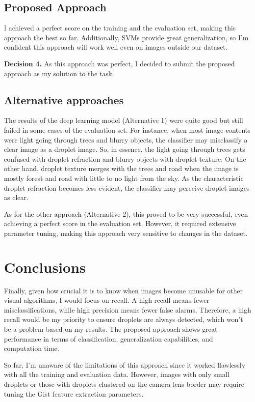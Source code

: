 \documentclass[conference]{IEEEtran}
\begin{document}
\subsection{Proposed Approach}

I achieved a perfect score on the training and the evaluation set, making this approach the best so far. Additionally, SVMs provide great generalization, so I'm confident this approach will work well even on images outside our dataset.

\textbf{Decision 4.} As this approach was perfect, I decided to submit the proposed approach as my solution to the task.

\subsection{Alternative approaches}

The results of the deep learning model (Alternative 1) were quite good but still failed in some cases of the evaluation set. For instance, when most image contents were light going through trees and blurry objects, the classifier may misclassify a clear image as a droplet image. So, in essence, the light going through trees gets confused with droplet refraction and blurry objects with droplet texture. On the other hand, droplet texture merges with the trees and road when the image is mostly forest and road with little to no light from the sky. As the characteristic droplet refraction becomes less evident, the classifier may perceive droplet images as clear.

As for the other approach (Alternative 2), this proved to be very successful, even achieving a perfect score in the evaluation set. However, it required extensive parameter tuning, making this approach very sensitive to changes in the dataset.

\section{Conclusions}

Finally, given how crucial it is to know when images become unusable for other visual algorithms, I would focus on recall. A high recall means fewer misclassifications, while high precision means fewer false alarms. Therefore, a high recall would be my priority to ensure droplets are always detected, which won't be a problem based on my results. The proposed approach shows great performance in terms of classification, generalization capabilities, and computation time.

So far, I'm unaware of the limitations of this approach since it worked flawlessly with all the training and evaluation data. However, images with only small droplets or those with droplets clustered on the camera lens border may require tuning the Gist feature extraction parameters.



\end{document}
